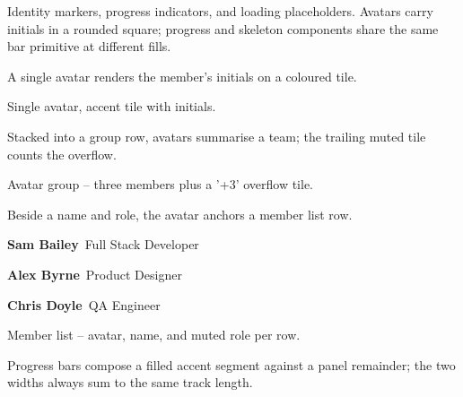 
Identity markers, progress indicators, and loading placeholders. Avatars carry initials in a rounded square; progress and skeleton components share the same bar primitive at different fills.


A single avatar renders the member's initials on a coloured tile.

\vspace{2mm}
\vspace{2mm}

{\small\color{muted}Single avatar, accent tile with initials.}

\vspace{4mm}

Stacked into a group row, avatars summarise a team; the trailing muted tile counts the overflow.

\vspace{2mm}
\vspace{2mm}

{\small\color{muted}Avatar group -- three members plus a '+3' overflow tile.}

\vspace{4mm}

Beside a name and role, the avatar anchors a member list row.

\vspace{2mm}

\noindent{}\quad\textbf{Sam Bailey}\ {\small\color{muted}Full Stack Developer}\par
\vspace{1.5mm}
\noindent{}\quad\textbf{Alex Byrne}\ {\small\color{muted}Product Designer}\par
\vspace{1.5mm}
\noindent{}\quad\textbf{Chris Doyle}\ {\small\color{muted}QA Engineer}\par

\vspace{2mm}
{\small\color{muted}Member list -- avatar, name, and muted role per row.}


Progress bars compose a filled accent segment against a panel remainder; the two widths always sum to the same track length.

\vspace{3mm}

